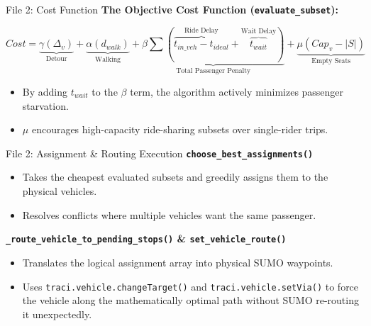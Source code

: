 \documentclass{beamer}
\begin{document}
\begin{frame}{File 2: Cost Function}
  \textbf{The Objective Cost Function (\texttt{evaluate\_subset}):}
  \vspace{0.2cm}
  
  \[ Cost = \underbrace{\gamma(\Delta_v)}_{\text{Detour}} + \underbrace{\alpha(d_{walk})}_{\text{Walking}} + \underbrace{\beta \sum (\overbrace{t_{in\_veh} - t_{ideal}}^{\text{Ride Delay}} + \overbrace{t_{wait}}^{\text{Wait Delay}})}_{\text{Total Passenger Penalty}} + \underbrace{\mu(Cap_v - |S|)}_{\text{Empty Seats}} \]
  
  \vspace{0.4cm}
  \begin{itemize}
      \item By adding $t_{wait}$ to the $\beta$ term, the algorithm actively minimizes passenger starvation.
      \item $\mu$ encourages high-capacity ride-sharing subsets over single-rider trips.
  \end{itemize}
\end{frame}

\begin{frame}{File 2: Assignment \& Routing Execution}
  \textbf{\texttt{choose\_best\_assignments()}}
  \begin{itemize}
      \item Takes the cheapest evaluated subsets and greedily assigns them to the physical vehicles.
      \item Resolves conflicts where multiple vehicles want the same passenger.
  \end{itemize}
  \vspace{0.3cm}
  \textbf{\texttt{\_route\_vehicle\_to\_pending\_stops()} \& \texttt{set\_vehicle\_route()}}
  \begin{itemize}
      \item Translates the logical assignment array into physical SUMO waypoints.
      \item Uses \texttt{traci.vehicle.changeTarget()} and \texttt{traci.vehicle.setVia()} to force the vehicle along the mathematically optimal path without SUMO re-routing it unexpectedly.
  \end{itemize}
\end{frame}
\end{document}
